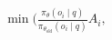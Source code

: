 \documentclass[preview]{standalone}
\begin{document}
\begin{align*}
\min \big(\frac{\pi_\theta(o_i \mid q)}{\pi_{\theta_{\text{old}}}(o_i \mid q)} A_i,
\end{align*}
\end{document}
